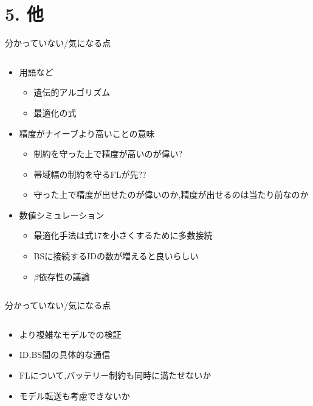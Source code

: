 \documentclass[unicode,12pt,aspectratio=169, dvipdfmx]{beamer}
\begin{document}
    \section{5. 他}
    \begin{frame}{分かっていない/気になる点}
        \begin{columns}
            \begin{column}{.8\linewidth}
                \begin{itemize}
                    \item 用語など
                    \begin{itemize}
                        \item 遺伝的アルゴリズム
                        \item 最適化の式
                    \end{itemize}
                    \item 精度がナイーブより高いことの意味
                    \begin{itemize}
                        \item 制約を守った上で精度が高いのが偉い?
                        \item 帯域幅の制約を守るFLが先??
                        \item 守った上で精度が出せたのが偉いのか,精度が出せるのは当たり前なのか
                    \end{itemize}
                    \item 数値シミュレーション
                    \begin{itemize}
                        \item 最適化手法は式17を小さくするために多数接続
                        \item BSに接続するIDの数が増えると良いらしい
                        \item $\beta$依存性の議論
                    \end{itemize}
                \end{itemize}          
            \end{column}
        \end{columns}
    \end{frame}

    \begin{frame}{分かっていない/気になる点}
        \begin{columns}
            \begin{column}{.8\linewidth}
                \begin{itemize}
                    \item より複雑なモデルでの検証
                    \item ID,BS間の具体的な通信
                    \item FLについて,バッテリー制約も同時に満たせないか
                    \item モデル転送も考慮できないか
                \end{itemize}          
            \end{column}
        \end{columns}
    \end{frame}
\end{document}
